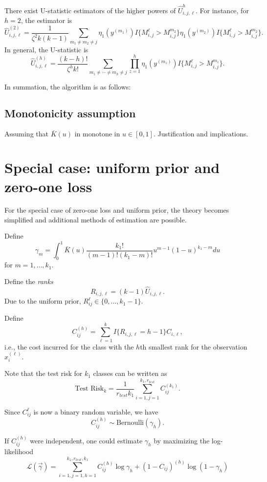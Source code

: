 \documentclass[12pt]{article}
\begin{document}
There exist U-statistic estimators of the higher powers of
$\hat{U}_{i,j,\ell}^h$.  For instance, for $h=2$, the estimator is
\[
\hat{U}_{i,j,\ell}^{(2)} = \frac{1}{\zeta^2 k(k-1)} \sum_{m_1\neq m_2 \neq j} \eta_1(y^{(m_1)}) I\{M_{i, j}^\ell > M_{i, j}^{m_2}\}
\eta_1(y^{(m_2)}) I\{M_{i, j}^\ell > M_{i, j}^{m_2}\}.
\]
In general, the U-statistic is
\[
\hat{U}_{i, j, \ell}^{(h)} = \frac{(k-h)!}{\zeta^h k!} \sum_{m_1 \neq \cdots \neq m_h \neq j} \prod_{z=1}^h \eta_1(y^{(m_z)}) I\{M_{i, j}^\ell > M_{i, j}^{m_z}\}.
\]

In summation, the algorithm is as follows:

\subsection{Monotonicity assumption}

Assuming that $\bar{K}(u)$ in monotone in $u \in [0,1]$.
Justification and implications.

\section{Special case: uniform prior and zero-one loss}

For the special case of zero-one loss and uniform prior, the theory
becomes simplified and additional methods of estimation are possible.

Define
\[
\gamma_m = \int_0^1 \bar{K}(u)  \frac{k_1!}{(m-1)!(k_1-m)!} u^{m-1} (1-u)^{k_1-m} du
\]
for $m = 1,\hdots, k_1$.

Define the \emph{ranks}
\[
R_{i, j, \ell} = (k-1)\hat{U}_{i, j, \ell}.
\]
Due to the uniform prior, $R_{ij}^\ell \in \{0,\hdots, k_1-1\}$.

Define
\[
C_{ij}^{(h)} = \sum_{\ell=1}^k I\{R_{i, j, \ell} = h - 1\} C_{i, \ell},
\]
i.e., the cost incurred for the class with the $h$th smallest rank for
the observation $x_i^{(\ell)}$.

Note that the test risk for $k_1$ classes can be written as
\[
\text{Test Risk}_k = \frac{1}{r_{test}k_1}\sum_{i=1,j=1}^{k_1,r_{test}} C_{ij}^{(k_1)}.
\]

Since $C_{ij}^\ell$ is now a binary random variable, we have
\[
C_{ij}^{(h)} \sim \text{Bernoulli}(\gamma_h).
\]

If $C_{ij}^{(h)}$ were independent, one could estimate $\gamma_h$ by
maximizing the log-likelihood
\begin{equation}\label{eq:pseudolikelihood1}
\mathcal{L}(\vec{\gamma}) = \sum_{i=1,j=1,h=1}^{k_1, r_{test}, k_1} C_{ij}^{(h)} \log \gamma_h + (1-C_{ij})^{(h)} \log (1-\gamma_h)
\end{equation}
\end{document}
